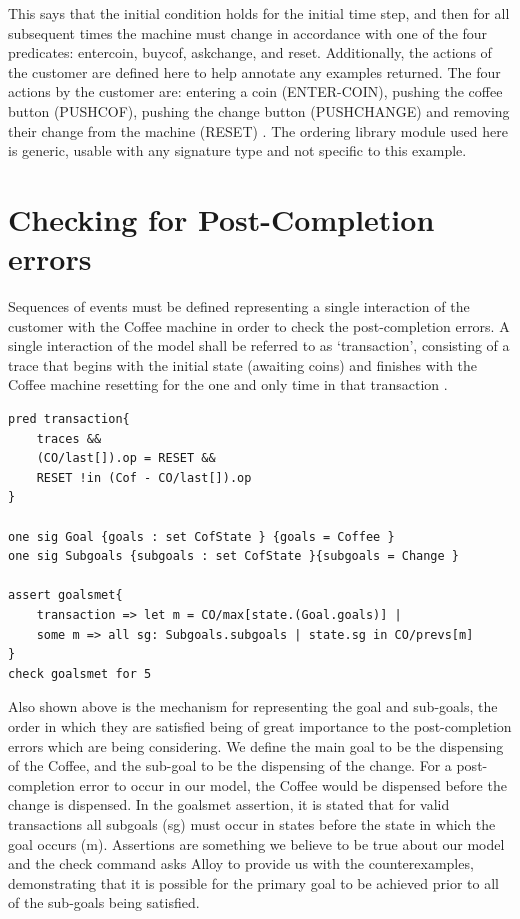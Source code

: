 \documentclass[a4paper,10pt]{report}
\begin{document}
This says that the initial condition holds for the initial time step, and then for all subsequent times the machine must change in accordance with one of the four predicates: entercoin, buycof, askchange, and reset. Additionally, the actions of the customer are defined here to help annotate any examples returned. The four actions by the customer are: entering a coin (ENTER-COIN), pushing the coffee button (PUSHCOF), pushing the change button (PUSHCHANGE) and removing their change from the machine (RESET) \cite{Boyatt}. The ordering library module used here is generic, usable with any signature type and not specific to this example.

\section{Checking for Post-Completion errors}
\label{Post completion error check}

Sequences of events must be defined representing a single interaction of the customer with the Coffee machine in order to check the post-completion errors. A single interaction of the model shall be referred to as `transaction’, consisting of a trace that begins with the initial state (awaiting coins) and finishes with the Coffee machine resetting for the one and only time in that transaction \cite{Boyatt}.

\begin{verbatim}
pred transaction{
	traces &&
	(CO/last[]).op = RESET &&
	RESET !in (Cof - CO/last[]).op
}

one sig Goal {goals : set CofState } {goals = Coffee }
one sig Subgoals {subgoals : set CofState }{subgoals = Change }

assert goalsmet{
	transaction => let m = CO/max[state.(Goal.goals)] |
	some m => all sg: Subgoals.subgoals | state.sg in CO/prevs[m]
}
check goalsmet for 5
\end{verbatim}

Also shown above is the mechanism for representing the goal and sub-goals, the order in which they are satisfied being of great importance to the post-completion errors which are being considering. We define the main goal to be the dispensing of the Coffee, and the sub-goal to be the dispensing of the change. For a post-completion error to occur in our model, the Coffee would be dispensed before the change is dispensed. In the goalsmet assertion, it is stated that for valid transactions all subgoals (sg) must occur in states before the state in which the goal occurs (m). Assertions are something we believe to be true about our model and the check command asks Alloy to provide us with the counterexamples, demonstrating that it is possible for the primary goal to be achieved prior to all of the sub-goals being satisfied.
\end{document}
